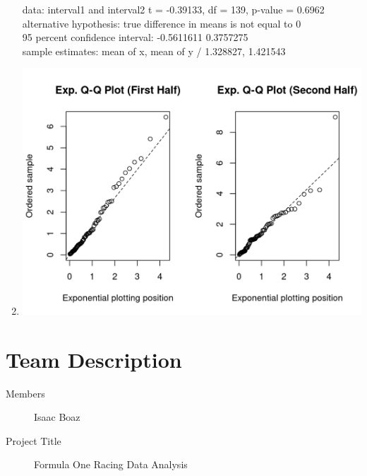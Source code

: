 \documentclass{article}
\begin{document}
\begin{enumerate}
          data:  interval1 and interval2
          t = -0.39133, df = 139, p-value = 0.6962 \\
          alternative hypothesis: true difference in means is not equal to 0 \\
          95 percent confidence interval:
          -0.5611611  0.3757275 \\
          sample estimates:
          mean of x, mean of y /
          1.328827, 1.421543
        \item \includegraphics[options]{q-qplot.png}
\end{enumerate}

\pagebreak
\section*{Team Description}
\begin{description}
    \item[Members] Isaac Boaz 
    \item[Project Title] Formula One Racing Data Analysis 
\end{description}
\end{document}
